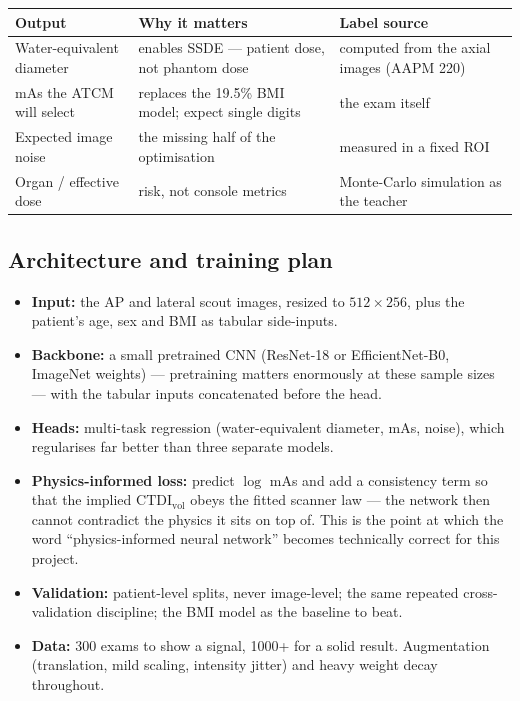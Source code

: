 \documentclass[10pt,a4paper]{article}
\newcommand{\ctdi}{\ensuremath{\mathrm{CTDI}_{\mathrm{vol}}}}
\newcommand{\hdr}{\rowcolor{ctsurf}}
\begin{document}
\begin{table}[h]\footnotesize
\begin{tabularx}{\linewidth}{@{}l L L@{}}
\toprule
\hdr \textbf{Output} & \textbf{Why it matters} & \textbf{Label source}\\
\midrule
Water-equivalent diameter & enables SSDE --- patient dose, not phantom dose & computed from the axial images (AAPM 220)\\
mAs the ATCM will select & replaces the 19.5\% BMI model; expect single digits & the exam itself\\
Expected image noise & the missing half of the optimisation & measured in a fixed ROI\\
Organ / effective dose & risk, not console metrics & Monte-Carlo simulation as the teacher\\
\bottomrule
\end{tabularx}
\end{table}

\subsection{Architecture and training plan}
\begin{itemize}
\item \textbf{Input:} the AP and lateral scout images, resized to $512\times256$, plus the patient's age, sex and
BMI as tabular side-inputs.
\item \textbf{Backbone:} a small pretrained CNN (ResNet-18 or EfficientNet-B0, ImageNet weights) --- pretraining
matters enormously at these sample sizes --- with the tabular inputs concatenated before the head.
\item \textbf{Heads:} multi-task regression (water-equivalent diameter, mAs, noise), which regularises far better
than three separate models.
\item \textbf{Physics-informed loss:} predict $\log$ mAs and add a consistency term so that the implied
\ctdi{} obeys the fitted scanner law --- the network then cannot contradict the physics it sits on top of. This is
the point at which the word ``physics-informed neural network'' becomes technically correct for this project.
\item \textbf{Validation:} patient-level splits, never image-level; the same repeated cross-validation discipline;
the BMI model as the baseline to beat.
\item \textbf{Data:} 300 exams to show a signal, 1000+ for a solid result. Augmentation (translation, mild scaling,
intensity jitter) and heavy weight decay throughout.
\end{itemize}
\end{document}
